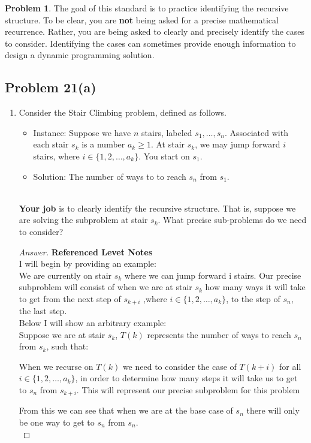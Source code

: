 \documentclass[11pt]{article}
\theoremstyle{definition}
\theoremstyle{definition}
\newtheorem{required}{Problem}
\theoremstyle{definition}
\begin{document}
\setcounter{required}{20}
\begin{required}
The goal of this standard is to practice identifying the recursive structure. To be clear, you are \textbf{not} being asked for a precise mathematical recurrence. Rather, you are being asked to clearly and precisely identify the cases to consider. Identifying the cases can sometimes provide enough information to design a dynamic programming solution.


\subsection*{Problem 21(a)}

\renewcommand{\theenumi}{\alph{enumi}}
\begin{enumerate}
\item Consider the \textsf{Stair Climbing} problem, defined as follows.
\begin{itemize}
\item \textsf{Instance:} Suppose we have $n$ stairs, labeled $s_{1}, \ldots, s_{n}$. Associated with each stair $s_{k}$ is a number $a_{k} \geq 1$. At stair $s_{k}$, we may jump forward $i$ stairs, where $i \in \{ 1, 2, \ldots, a_{k}\}$. You start on $s_{1}$.

\item \textsf{Solution:} The number of ways to to reach $s_{n}$ from $s_{1}$.
\end{itemize}

\noindent \\ \textbf{Your job} is to clearly identify the recursive structure. That is, suppose we are solving the subproblem at stair $s_{k}$. What precise sub-problems do we need to consider?

\begin{proof}[Answer] \textbf{Referenced Levet Notes} \\
I will begin by providing an example: \\ 

We are currently on stair $s_k$ where we can jump forward i stairs. Our precise subproblem will consist of when we are at stair $s_k$ how many ways it will take to get from the next step of $s_{k+i}$ ,where $i \in \{ 1, 2, \ldots, a_{k}\}$, to the  step of $s_n$, the last step. \\

Below I will show an arbitrary example: \\
Suppose we are at stair $s_k$,  $T(k)$ represents the number of ways to reach $s_n$ from $s_k$, such that: \\
\begin{center}
When we recurse on $T(k)$ we need to consider the case of $T(k+i)$ for all $i \in \{ 1, 2, \ldots, a_{k}\}$, in order to determine how many steps it will take us to get to $s_n$ from $s_{k+i}$. This will represent our precise subproblem for this problem\\
\end{center}
From this we can see that when we are at the base case of $s_n$ there will only be one way to get to $s_n$ from $s_n$. \\


\end{proof}
\end{enumerate}
\end{required}
\end{document}
